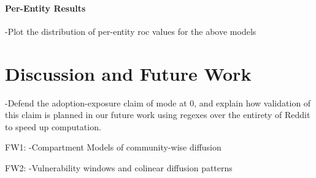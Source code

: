 \documentclass[journal,10pt,draftclsnofoot,onecolumn]{IEEEtran}
\begin{document}
\paragraph{Per-Entity Results}
-Plot the distribution of per-entity roc values for the above models

\section{Discussion and Future Work}
-Defend the adoption-exposure claim of mode at 0, and explain how validation of this claim is planned in our future work using regexes over the entirety of Reddit to speed up computation.

FW1:
-Compartment Models of community-wise diffusion

FW2:
-Vulnerability windows and colinear diffusion patterns



%


%
%
%
%
%
%
%
\end{document}
